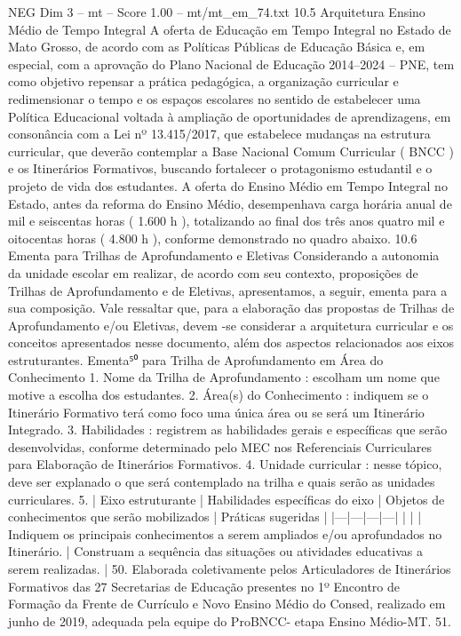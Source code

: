 \begin{textsample}{NEG Dim 3 – mt – Score 1.00 – mt/mt\_em\_74.txt}  \label{ex:f3_neg_220}
10.5 Arquitetura Ensino Médio de Tempo Integral A oferta de Educação em Tempo Integral no Estado de Mato Grosso, de acordo com as Políticas Públicas de Educação Básica e, em especial, com a aprovação do Plano Nacional de Educação 2014–2024 – PNE, tem como objetivo repensar a prática pedagógica, a organização curricular e redimensionar o tempo e os espaços escolares no sentido de estabelecer uma Política Educacional voltada à ampliação de oportunidades de aprendizagens, em consonância com a Lei nº 13.415/2017, que estabelece mudanças na estrutura curricular, que deverão contemplar a Base Nacional Comum Curricular ( BNCC ) e os Itinerários Formativos, buscando fortalecer o protagonismo estudantil e o projeto de vida dos estudantes.
A oferta do Ensino Médio em Tempo Integral no Estado, antes da reforma do Ensino Médio, desempenhava carga horária anual de mil e seiscentas horas ( 1.600 h ), totalizando ao final dos três anos quatro mil e oitocentas horas ( 4.800 h ), conforme demonstrado no quadro abaixo. 10.6 Ementa para Trilhas de Aprofundamento e Eletivas Considerando a autonomia da unidade escolar em realizar, de acordo com seu contexto, proposições de Trilhas de Aprofundamento e de Eletivas, apresentamos, a seguir, ementa para a sua composição.
Vale ressaltar que, para a elaboração das propostas de Trilhas de Aprofundamento e/ou Eletivas, devem -se considerar a arquitetura curricular e os conceitos apresentados nesse documento, além dos aspectos relacionados aos eixos estruturantes.
Ementa⁵⁰ para Trilha de Aprofundamento em Área do Conhecimento 1.
Nome da Trilha de Aprofundamento : escolham um nome que motive a escolha dos estudantes. 2.
Área(s) do Conhecimento : indiquem se o Itinerário Formativo terá como foco uma única área ou se será um Itinerário Integrado. 3.
Habilidades : registrem as habilidades gerais e específicas que serão desenvolvidas, conforme determinado pelo MEC nos Referenciais Curriculares para Elaboração de Itinerários Formativos. 4.
Unidade curricular : nesse tópico, deve ser explanado o que será contemplado na trilha e quais serão as unidades curriculares. 5. | Eixo estruturante | Habilidades específicas do eixo | Objetos de conhecimentos que serão mobilizados | Práticas sugeridas | |---|---|---|---| | | | Indiquem os principais conhecimentos a serem ampliados e/ou aprofundados no Itinerário. | Construam a sequência das situações ou atividades educativas a serem realizadas. | 50.
Elaborada coletivamente pelos Articuladores de Itinerários Formativos das 27 Secretarias de Educação presentes no 1º Encontro de Formação da Frente de Currículo e Novo Ensino Médio do Consed, realizado em junho de 2019, adequada pela equipe do ProBNCC- etapa Ensino Médio-MT. 51.

\end{textsample}
